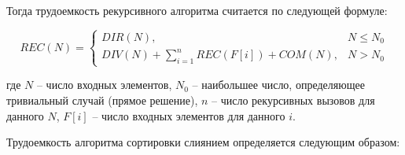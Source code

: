 Тогда трудоемкость рекурсивного алгоритма считается по следующей формуле:

\begin{equation}
	\label{eq:rec}
	REC(N) =
	\begin{cases}
		DIR(N), & N \leq N_0\\
		DIV(N) + \displaystyle\sum_{i=1}^{n} REC(F[i]) + COM(N), & N > N_0
	\end{cases}
\end{equation}

где $N$ -- число входных элементов, $N_0$ -- наибольшее число, определяющее тривиальный случай (прямое решение), $n$ -- число рекурсивных вызовов для данного $N$, $F[i]$ -- число входных элементов для данного $i$.

Трудоемкость алгоритма сортировки слиянием определяется следующим образом:

